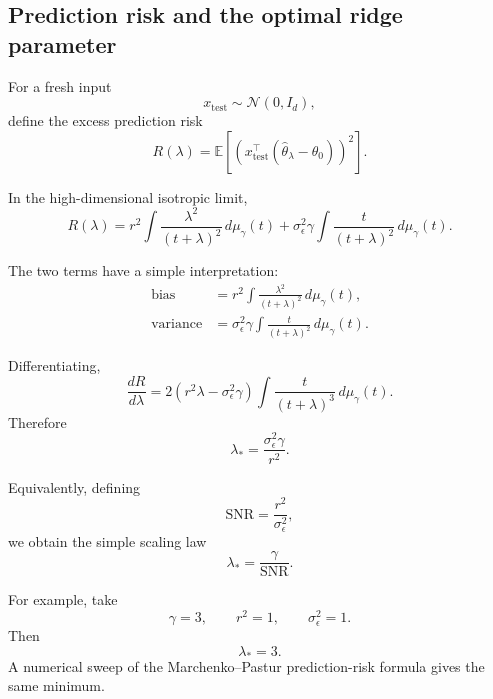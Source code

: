 \subsection{Prediction risk and the optimal ridge parameter}

For a fresh input
\[
x_{\mathrm{test}}
\sim
\mathcal{N}(0,I_d),
\]
define the excess prediction risk
\begin{equation}
    R(\lambda)
    =
    \mathbb{E}
    \left[
        \left(
            x_{\mathrm{test}}^\top
            (\widehat{\theta}_\lambda-\theta_0)
        \right)^2
    \right].
\end{equation}

In the high-dimensional isotropic limit,
\begin{equation}
\boxed{
R(\lambda)
=
r^2
\int
\frac{\lambda^2}{(t+\lambda)^2}
\,d\mu_\gamma(t)
+
\sigma_\epsilon^2\gamma
\int
\frac{t}{(t+\lambda)^2}
\,d\mu_\gamma(t).
}
\end{equation}

The two terms have a simple interpretation:
\begin{align}
    \text{bias}
    &=
    r^2
    \int
    \frac{\lambda^2}{(t+\lambda)^2}
    \,d\mu_\gamma(t),
    \\
    \text{variance}
    &=
    \sigma_\epsilon^2\gamma
    \int
    \frac{t}{(t+\lambda)^2}
    \,d\mu_\gamma(t).
\end{align}

Differentiating,
\begin{equation}
    \frac{dR}{d\lambda}
    =
    2
    \left(
        r^2\lambda
        -
        \sigma_\epsilon^2\gamma
    \right)
    \int
    \frac{t}{
        (t+\lambda)^3
    }
    \,d\mu_\gamma(t).
\end{equation}
Therefore
\begin{equation}
    \boxed{
        \lambda_*
        =
        \frac{
            \sigma_\epsilon^2\gamma
        }{
            r^2
        }.
    }
\end{equation}

Equivalently, defining
\begin{equation}
    \mathrm{SNR}
    =
    \frac{r^2}{\sigma_\epsilon^2},
\end{equation}
we obtain the simple scaling law
\begin{equation}
    \boxed{
        \lambda_*
        =
        \frac{\gamma}{\mathrm{SNR}}.
    }
\end{equation}

For example, take
\[
\gamma=3,
\qquad
r^2=1,
\qquad
\sigma_\epsilon^2=1.
\]
Then
\begin{equation}
    \boxed{
        \lambda_*=3.
    }
\end{equation}
A numerical sweep of the Marchenko--Pastur prediction-risk
formula gives the same minimum.


